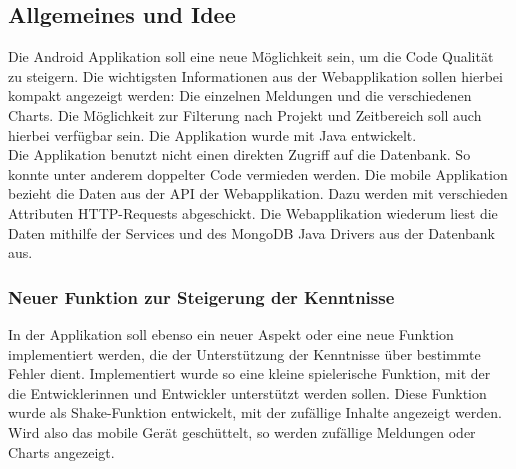 \subsection{Allgemeines und Idee}
Die Android Applikation soll eine neue Möglichkeit sein, um die Code Qualität zu steigern. Die wichtigsten Informationen aus der Webapplikation sollen hierbei kompakt angezeigt werden: Die einzelnen Meldungen und die verschiedenen Charts. Die Möglichkeit zur Filterung nach Projekt und Zeitbereich soll auch hierbei verfügbar sein. Die Applikation wurde mit Java entwickelt. \\ Die Applikation benutzt nicht einen direkten Zugriff auf die Datenbank. So konnte unter anderem doppelter Code vermieden werden. Die mobile Applikation bezieht die Daten aus der API der Webapplikation. Dazu werden mit verschieden Attributen HTTP-Requests abgeschickt. Die Webapplikation wiederum liest die Daten mithilfe der Services und des MongoDB Java Drivers aus der Datenbank aus.
\subsubsection{Neuer Funktion zur Steigerung der Kenntnisse}
In der Applikation soll ebenso ein neuer Aspekt oder eine neue Funktion implementiert werden, die der Unterstützung der Kenntnisse über bestimmte Fehler dient. Implementiert wurde so eine kleine spielerische Funktion, mit der die Entwicklerinnen und Entwickler unterstützt werden sollen. Diese Funktion wurde als Shake-Funktion entwickelt, mit der zufällige Inhalte angezeigt werden. Wird also das mobile Gerät geschüttelt, so werden zufällige Meldungen oder Charts angezeigt.
\chapterend